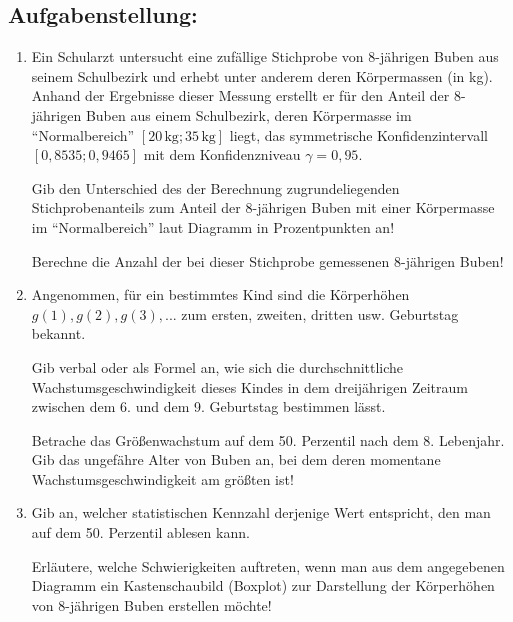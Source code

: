 \begin{langesbeispiel}
\subsection{Aufgabenstellung:}
\begin{enumerate}
	\item Ein Schularzt untersucht eine zufällige Stichprobe von 8-jährigen Buben aus seinem Schulbezirk und erhebt unter anderem deren Körpermassen (in kg). Anhand der Ergebnisse dieser Messung erstellt er für den Anteil der 8-jährigen Buben aus einem Schulbezirk, deren Körpermasse im "`Normalbereich"' $[20\,\text{kg};35\,\text{kg}]$ liegt, das symmetrische Konfidenzintervall $[0,8535;0,9465]$ mit dem Konfidenzniveau $\gamma=0,95$.\leer
	
	Gib den Unterschied des der Berechnung zugrundeliegenden Stichprobenanteils zum Anteil der 8-jährigen Buben mit einer Körpermasse im "`Normalbereich"' laut Diagramm in Prozentpunkten an!\leer
	
	Berechne die Anzahl der bei dieser Stichprobe gemessenen 8-jährigen Buben!\leer
	
	\item Angenommen, für ein bestimmtes Kind sind die Körperhöhen $g(1),g(2),g(3),...$ zum ersten, zweiten, dritten usw. Geburtstag bekannt.
	
	Gib verbal oder als Formel an, wie sich die durchschnittliche Wachstumsgeschwindigkeit dieses Kindes in dem dreijährigen Zeitraum zwischen dem 6. und dem 9. Geburtstag bestimmen lässt.\leer
	
	Betrache das Größenwachstum auf dem 50. Perzentil nach dem 8. Lebenjahr. Gib das ungefähre Alter von Buben an, bei dem deren momentane Wachstumsgeschwindigkeit am größten ist!\leer
	
	\item Gib an, welcher statistischen Kennzahl derjenige Wert entspricht, den man auf dem 50. Perzentil ablesen kann.\leer
	
	Erläutere, welche Schwierigkeiten auftreten, wenn man aus dem angegebenen Diagramm ein Kastenschaubild (Boxplot) zur Darstellung der Körperhöhen von 8-jährigen Buben erstellen möchte!
	
	\end{enumerate}

\end{langesbeispiel}
